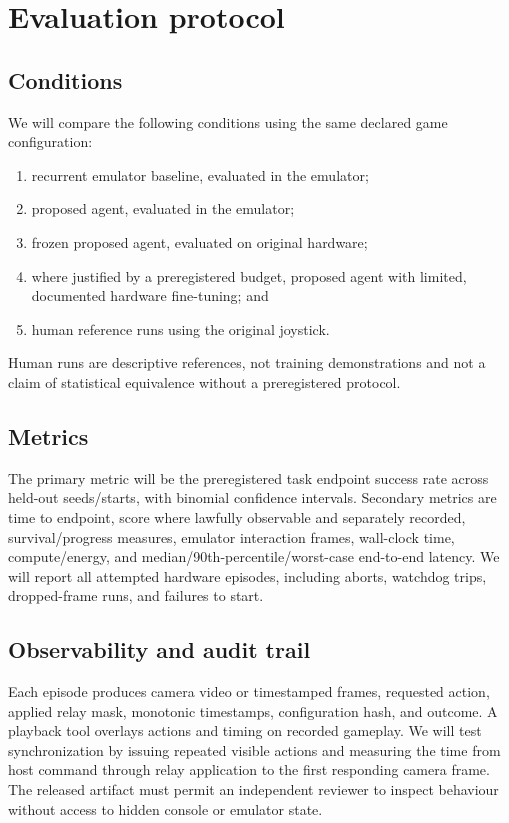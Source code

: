 \documentclass[11pt]{article}
\begin{document}
\section{Evaluation protocol}

\subsection{Conditions}

We will compare the following conditions using the same declared game
configuration:
\begin{enumerate}[leftmargin=*]
  \item recurrent emulator baseline, evaluated in the emulator;
  \item proposed agent, evaluated in the emulator;
  \item frozen proposed agent, evaluated on original hardware;
  \item where justified by a preregistered budget, proposed agent with limited,
        documented hardware fine-tuning; and
  \item human reference runs using the original joystick.
\end{enumerate}
Human runs are descriptive references, not training demonstrations and not a
claim of statistical equivalence without a preregistered protocol.

\subsection{Metrics}

The primary metric will be the preregistered task endpoint success rate across
held-out seeds/starts, with binomial confidence intervals.  Secondary metrics
are time to endpoint, score where lawfully observable and separately recorded,
survival/progress measures, emulator interaction frames, wall-clock time,
compute/energy, and median/90th-percentile/worst-case end-to-end latency.
We will report all attempted hardware episodes, including aborts, watchdog
trips, dropped-frame runs, and failures to start.

\subsection{Observability and audit trail}

Each episode produces camera video or timestamped frames, requested action,
applied relay mask, monotonic timestamps, configuration hash, and outcome.
A playback tool overlays actions and timing on recorded gameplay.  We will
test synchronization by issuing repeated visible actions and measuring the
time from host command through relay application to the first responding camera
frame.  The released artifact must permit an independent reviewer to inspect
behaviour without access to hidden console or emulator state.
\end{document}
